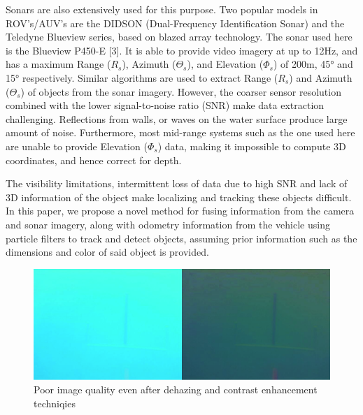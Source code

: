 \documentclass[a4paper]{IEEEtran}
\let\Theta\varTheta
\let\Phi\varPhi
\newcommand{\RSonar}{$\si{\textit{R}_{s}}$\xspace}
\newcommand{\ThetaSonar}{$\si{\Theta_{s}}$\xspace}
\newcommand{\PhiSonar}{$\si{\Phi_{s}}$\xspace}
\begin{document}
Sonars are also extensively used for this purpose. Two popular models in ROV's/AUV's are the DIDSON (Dual-Frequency Identification Sonar) and the Teledyne Blueview series, based on blazed array technology. The sonar used here is the Blueview P450-E [3]. It is able to provide video imagery at up to 12Hz, and has a maximum Range (\RSonar), Azimuth (\ThetaSonar), and Elevation (\PhiSonar) of 200m, 45\si{\degree} and 15\si{\degree} respectively.  Similar algorithms are used to extract Range (\RSonar) and Azimuth (\ThetaSonar) of objects from the sonar imagery.  However, the coarser sensor resolution combined with the lower signal-to-noise ratio (SNR) make data extraction challenging. Reflections from walls, or waves on the water surface produce large amount of noise. Furthermore, most mid-range systems such as the one used here are unable to provide Elevation (\PhiSonar) data, making it impossible to compute 3D coordinates, and hence correct for depth.

The visibility limitations, intermittent loss of data due to high SNR and lack of 3D information of the object make localizing and tracking these objects difficult. In this paper, we propose a novel method for fusing information from the camera and sonar imagery, along with odometry information from the vehicle using particle filters to track and detect objects, assuming prior information such as the dimensions and color of said object is provided.

\begin{figure}[h!]
  \centering
  \includegraphics[scale=0.5]{imageUnderwater}
  \captionsetup{justification=centering}
  \caption{Poor image quality even after dehazing and contrast enhancement techniqies}
\end{figure}
\end{document}
